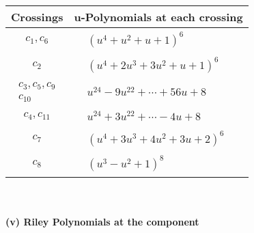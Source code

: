 \documentclass[1p]{elsarticle_modified}
\theoremstyle{definition}
\begin{document}
\begin{tabular}{m{50pt}|m{274pt}}
Crossings & \hspace{64pt}u-Polynomials at each crossing \\
\hline $$\begin{aligned}c_{1},c_{6}\end{aligned}$$&$\begin{aligned}
&(u^4+u^2+u+1)^6
\end{aligned}$\\
\hline $$\begin{aligned}c_{2}\end{aligned}$$&$\begin{aligned}
&(u^4+2 u^3+3 u^2+u+1)^6
\end{aligned}$\\
\hline $$\begin{aligned}c_{3},c_{5},c_{9}\\c_{10}\end{aligned}$$&$\begin{aligned}
&u^{24}-9 u^{22}+\cdots+56 u+8
\end{aligned}$\\
\hline $$\begin{aligned}c_{4},c_{11}\end{aligned}$$&$\begin{aligned}
&u^{24}+3 u^{22}+\cdots-4 u+8
\end{aligned}$\\
\hline $$\begin{aligned}c_{7}\end{aligned}$$&$\begin{aligned}
&(u^4+3 u^3+4 u^2+3 u+2)^6
\end{aligned}$\\
\hline $$\begin{aligned}c_{8}\end{aligned}$$&$\begin{aligned}
&(u^3- u^2+1)^8
\end{aligned}$\\
\hline
\end{tabular}\\~\\
\newpage\renewcommand{\arraystretch}{1}
\flushleft \textbf{(v) Riley Polynomials at the component}\newline \\
\end{document}
